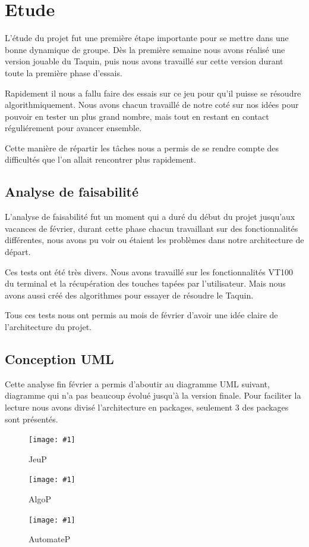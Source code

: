 ﻿\documentclass[a4paper,twoside,12pt]{report}
\newcommand{\monimage}[4]{
\par\noindent
\begin{figure}[H] %
\begin{center}
\texttt{[image: \#1]} %
\caption{#2} %
\label{#3} %
\end{center}
\end{figure} %
}
\newcommand{\ml}[0]{\par\noindent}
\begin{document}
\chapter{Etude}
\par
L'étude du projet fut une première étape importante pour se mettre dans une 
bonne dynamique de groupe. Dès la première semaine nous avons réalisé une 
version jouable du Taquin, puis nous avons travaillé sur cette version durant 
toute la première phase d'essais.
\par\noindent
Rapidement il nous a fallu faire des essais sur ce jeu pour qu'il puisse se 
résoudre algorithmiquement. Nous avons chacun travaillé de notre coté sur nos 
idées pour pouvoir en tester un plus grand nombre, mais tout en restant en 
contact réguliérement pour avancer ensemble.
\par\noindent
Cette manière de répartir les tâches nous a permis de se rendre compte des 
difficultés que l'on allait rencontrer plus rapidement.
%
\section{Analyse de faisabilité}
\par
L'analyse de faisabilité fut un moment qui a duré du début du projet jusqu'aux 
vacances de février, durant cette phase chacun travaillant sur des 
fonctionnalités différentes, nous avons pu voir ou étaient les problèmes dans 
notre architecture de départ.
\par\noindent
Ces tests ont été très divers. Nous avons travaillé sur les fonctionnalités 
VT100 du terminal et la récupération des touches tapées par l'utilisateur. Mais 
nous avons aussi créé des algorithmes pour essayer de résoudre le Taquin.
\par\noindent
Tous ces tests nous ont permis au mois de février d'avoir une idée claire de 
l'architecture du projet.
\section{Conception UML}
\par
Cette analyse fin février a permis d'aboutir au diagramme UML suivant, diagramme 
qui n'a pas beaucoup évolué jusqu'à la version finale. Pour
faciliter la lecture nous avons divisé l'architecture en packages, seulement 3 
des packages sont présentés.
\ml
\monimage{../dev/jeuPackage.png}{JeuP}{Représentation UML du package jeu}{0.9}
\ml
\monimage{../dev/algoPackage.png}{AlgoP}{Représentation UML du package 
algo}{0.9}
\ml
\monimage{../dev/automatePackage.png}{AutomateP}{Représentation UML du package 
automate}{0.3}
\end{document}
